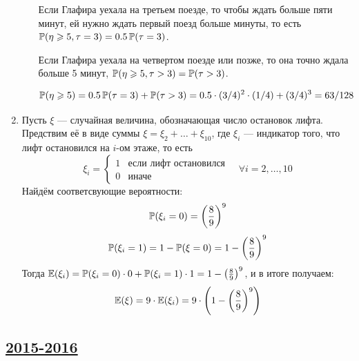 \begin{enumerate}
\begin{enumerate}
Если Глафира уехала на третьем поезде, то чтобы ждать больше пяти минут,
ей нужно ждать первый поезд больше минуты,
то есть $\P(\eta \geq 5, \tau = 3)=0.5 \P(\tau = 3)$.

Если Глафира уехала на четвертом поезде или позже, то она точно ждала больше 5 минут,
$\P(\eta \geq 5, \tau >3)=\P(\tau>3)$.

\[
\P(\eta \geq 5) = 0.5\P(\tau = 3) + \P(\tau > 3) = 0.5 \cdot (3/4)^2 \cdot (1/4) + (3/4)^3 = 63 / 128
\]

\end{enumerate}
\item Пусть $\xi$ — случайная величина, обозначающая число остановок лифта. Предствим её в виде суммы $\xi = \xi_2 + \ldots + \xi_{10}$, где $\xi_i$ — индикатор
того, что лифт остановился на $i$-ом этаже, то есть
\[
\xi_i = \begin{cases}
1 & \text{если лифт остановился} \\
0 & \text{иначе}
\end{cases}
\quad \forall i = 2, \ldots, 10
\]
Найдём соответсвующие вероятности:
\[
\P(\xi_i = 0) = \left(\frac{8}{9}\right)^9
\]
\[
\P(\xi_i = 1) = 1 - \P(\xi = 0) = 1 - \left(\frac{8}{9}\right)^9
\]
Тогда $\E(\xi_i) = \P(\xi_i = 0) \cdot 0 + \P(\xi_i = 1) \cdot 1 = 1 - \left(\frac{8}{9}\right)^9$, и в итоге получаем:
\[
\E(\xi) = 9 \cdot \E(\xi_i) = 9 \cdot \left(1 - \left(\frac{8}{9}\right)^9\right)
\]
\end{enumerate}

\subsection[2015-2016]{\hyperref[sec:kr_01_2015_2016]{2015-2016}}
\label{sec:sol_kr_01_2015_2016}

